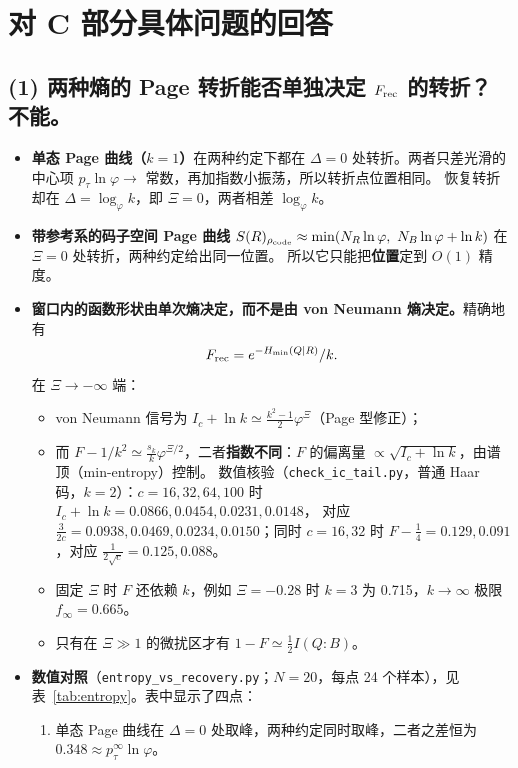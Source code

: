 \documentclass[11pt,a4paper,UTF8]{ctexart}
\newcommand{\Frec}{F_{\rm rec}}
\newcommand{\code}[1]{\texttt{#1}}
\begin{document}
\section{对 C 部分具体问题的回答}\label{sec:answers}

\subsection*{(1) 两种熵的 Page 转折能否单独决定 \texorpdfstring{$\Frec$}{F\_rec} 的转折？不能。}
\begin{itemize}
  \item \textbf{单态 Page 曲线（$k=1$）}在两种约定下都在 $\Delta=0$ 处转折。两者只差光滑的中心项 $p_\tau\ln\varphi\to$ 常数，再加指数小振荡，所以转折点位置相同。
  恢复转折却在 $\Delta=\log_\varphi k$，即 $\Xi=0$，两者相差 $\log_\varphi k$。
  \item \textbf{带参考系的码子空间 Page 曲线} $S(R)_{\rho_{\rm code}}\approx\min(N_R\ln\varphi,\ N_B\ln\varphi+\ln k)$ 在 $\Xi=0$ 处转折，两种约定给出同一位置。
  所以它只能把\textbf{位置}定到 $O(1)$ 精度。
  \item \textbf{窗口内的函数形状由单次熵决定，而不是由 von Neumann 熵决定。}精确地有
  \[\Frec=e^{-H_{\min}(Q|R)}/k.\]
  在 $\Xi\to-\infty$ 端：
  \begin{itemize}
    \item von Neumann 信号为 $I_c+\ln k\simeq\frac{k^2-1}{2}\varphi^{\Xi}$（Page 型修正）；
    \item 而 $F-1/k^2\simeq\frac{s_k}k\varphi^{\Xi/2}$，二者\textbf{指数不同}：$F$ 的偏离量 $\propto\sqrt{I_c+\ln k}$，由谱顶（min-entropy）控制。
    数值核验（\code{check\_ic\_tail.py}，普通 Haar 码，$k=2$）：$c=16,32,64,100$ 时 $I_c+\ln k=0.0866,0.0454,0.0231,0.0148$，
    对应 $\frac{3}{2c}=0.0938,0.0469,0.0234,0.0150$；同时 $c=16,32$ 时 $F-\frac14=0.129,0.091$，对应 $\frac{1}{2\sqrt c}=0.125,0.088$。
    \item 固定 $\Xi$ 时 $F$ 还依赖 $k$，例如 $\Xi=-0.28$ 时 $k=3$ 为 0.715，$k\to\infty$ 极限 $f_\infty=0.665$。
    \item 只有在 $\Xi\gg1$ 的微扰区才有 $1-F\simeq\frac12I(Q\!:\!B)$。
  \end{itemize}
  \item \textbf{数值对照}（\code{entropy\_vs\_recovery.py}；$N=20$，每点 24 个样本），见表~\ref{tab:entropy}。表中显示了四点：
  \begin{enumerate}
    \item 单态 Page 曲线在 $\Delta=0$ 处取峰，两种约定同时取峰，二者之差恒为 $0.348\approx p_\tau^\infty\ln\varphi$。

\end{enumerate}
\end{itemize}
\end{document}
